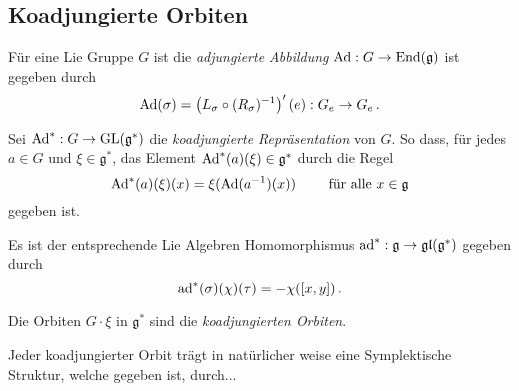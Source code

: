 \subsection{Koadjungierte Orbiten}
\begin{comment}
\begin{itemize}
\item 
siehe \cite{bryant} auf Seite 86ff
\begin{itemize}
\item 
vor allem \cite[Proposition 3]{bryant} auf Seite 86.
\end{itemize}
\item 
siehe \cite{warnerLie} auf Seite 112ff
\item
siehe \cite{ki99}
für die Symplektische Struktur
\end{itemize}
\end{comment}
\begin{defn}
Für eine Lie Gruppe $G$ ist die \emph{adjungierte Abbildung} 
$\operatorname{Ad}: G \to \operatorname{End}(\mathfrak g)$ 
ist gegeben durch
\[
\operatorname{Ad}(\sigma)=\left(L_\sigma\circ (R_\sigma)^{-1}\right)'(e):G_e\to G_e \,.
\]
\end{defn}
\begin{comment}
\begin{defn} \comm{(siehe Seite 16 \protect\cite{bryant})}
 ...die \emph{adjungierte Repräsentation von $G$}...
\end{defn}
\end{comment}
\begin{defn}
Sei $\operatorname{Ad}^*:G\to\operatorname{GL}(\mathfrak g^*)$ die \emph{koadjungierte Repräsentation}
von $G$.
So dass, für jedes $a\in G$ und $\xi \in \mathfrak g^*$, das Element
$\operatorname{Ad}^*(a)(\xi)\in \mathfrak g^*$ durch die Regel
\[
\operatorname{Ad}^*(a)(\xi)(x)=\xi(\operatorname{Ad}(a^{-1})(x)) \qquad \text{ für alle } x\in \mathfrak g
\]
gegeben ist.
\end{defn}
\begin{bem} 
Es ist der entsprechende Lie Algebren Homomorphismus $\operatorname{ad}^*:\mathfrak g \to
\mathfrak{gl(g^*)}$ gegeben durch
\[
\operatorname{ad}^*(\sigma)(\chi)(\tau)=-\chi([x,y]) \,.
\]
\end{bem}
\begin{defn} 
Die Orbiten $G\cdot \xi$ in $\mathfrak g^*$ sind die
\emph{koadjungierten Orbiten}.
\end{defn}
Jeder koadjungierter Orbit trägt in natürlicher weise eine Symplektische
Struktur, welche gegeben ist, durch...
\begin{comment}
\begin{ex} \comm{(von \protect\cite[p. 96]{bryant})}
\textbf{10.} For any Lie group $G$ and any $\xi\in\mathfrak g^∗$, show that the
symplectic structures $\Omega_\xi$ and $\Omega_{\sigma\cdot\xi}$ on
$G\cdot\xi$ are the same for any $\sigma\in G$.
\end{ex}
\end{comment}


